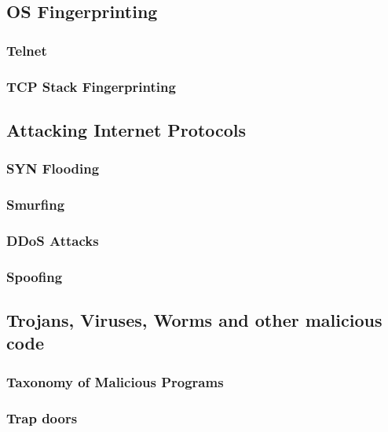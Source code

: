 \documentclass[a4paper, 10 pt, conference]{ieeeconf}
\begin{document}
\subsection{\textbf{OS Fingerprinting}}

\subsubsection{\textbf{Telnet}}

\subsubsection{\textbf{TCP Stack Fingerprinting}}

\subsection{\textbf{Attacking Internet Protocols}}

\subsubsection{\textbf{SYN Flooding}}

\subsubsection{\textbf{Smurfing}}

\subsubsection{\textbf{DDoS Attacks}}

\subsubsection{\textbf{Spoofing}}

\subsection{\textbf{Trojans, Viruses, Worms and other malicious code}}

\subsubsection{\textbf{Taxonomy of Malicious Programs}}

\subsubsection{\textbf{Trap doors}}
\end{document}
